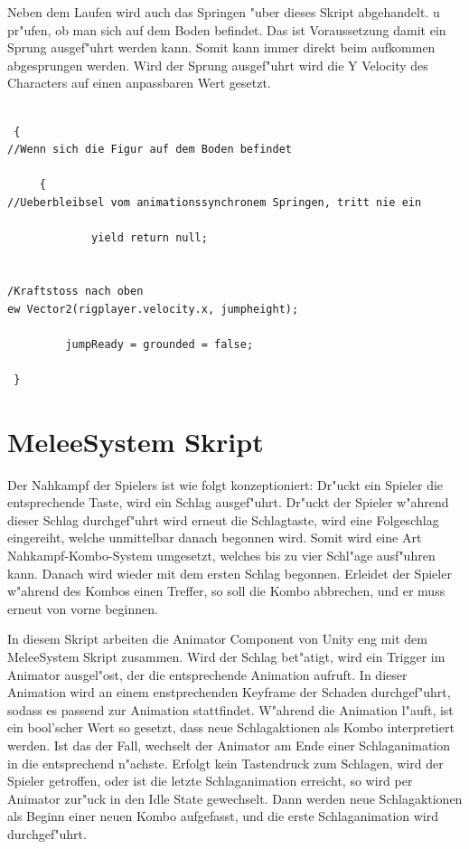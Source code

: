 Neben dem Laufen wird auch das Springen "uber dieses Skript abgehandelt.
u pr"ufen, ob man sich auf dem Boden befindet. Das ist Voraussetzung damit ein Sprung ausgef"uhrt werden kann. Somit kann immer direkt beim aufkommen abgesprungen werden. Wird der Sprung ausgef"uhrt wird die Y Velocity des Characters auf einen anpassbaren Wert gesetzt.


\begin{lstlisting}[breaklines=true]

 {
//Wenn sich die Figur auf dem Boden befindet

	 {
//Ueberbleibsel vom animationssynchronem Springen, tritt nie ein

			 yield return null;  

			 
/Kraftstoss nach oben
ew Vector2(rigplayer.velocity.x, jumpheight);

		 jumpReady = grounded = false;

 }
\end{lstlisting}


\section{MeleeSystem Skript}
Der Nahkampf der Spielers ist wie folgt konzeptioniert:
Dr"uckt ein Spieler die entsprechende Taste, wird ein Schlag ausgef"uhrt. Dr"uckt der Spieler w"ahrend dieser Schlag durchgef"uhrt wird erneut die Schlagtaste, wird eine Folgeschlag eingereiht, welche unmittelbar danach begonnen wird. Somit wird eine Art Nahkampf-Kombo-System umgesetzt, welches bis zu vier Schl"age ausf"uhren kann. Danach wird wieder mit dem ersten Schlag begonnen. Erleidet der Spieler w"ahrend des Kombos einen Treffer, so soll die Kombo abbrechen, und er muss erneut von vorne beginnen.\newline

In diesem Skript arbeiten die Animator Component von Unity eng mit dem MeleeSystem Skript zusammen. Wird der Schlag bet"atigt, wird ein Trigger im Animator ausgel"ost, der die entsprechende Animation aufruft. In dieser Animation wird an einem enstprechenden Keyframe der Schaden durchgef"uhrt, sodass es passend zur Animation stattfindet. W"ahrend die Animation l"auft, ist ein bool'scher Wert so gesetzt, dass neue Schlagaktionen als Kombo interpretiert werden. Ist das der Fall, wechselt der Animator am Ende einer Schlaganimation in die entsprechend n"achste. Erfolgt kein Tastendruck zum Schlagen, wird der Spieler getroffen, oder ist die letzte Schlaganimation erreicht, so wird per Animator zur"uck in den Idle State  gewechselt. Dann werden neue Schlagaktionen als Beginn einer neuen Kombo aufgefasst, und die erste Schlaganimation wird durchgef"uhrt.\newline

